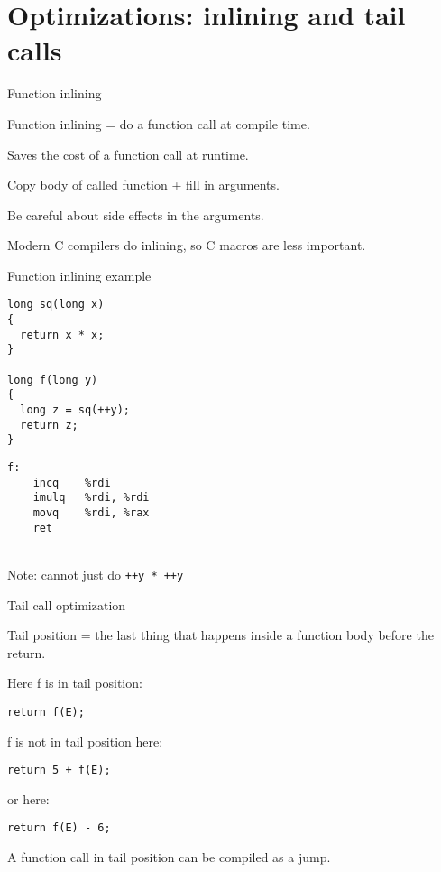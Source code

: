 \documentclass[landscape]{beamer}
\begin{document}
\section{Optimizations: inlining and tail calls}


\begin{frame}{Function inlining}

Function inlining = do a function call at compile time.

Saves the cost of a function call at runtime.

Copy body of called function + fill in arguments.

Be careful about side effects in the arguments.

Modern C compilers do inlining, so C macros are less important.

\end{frame}

\begin{frame}[fragile]{Function inlining example}
\begin{minipage}{.5\textwidth}
\begin{verbatim}
long sq(long x)
{
  return x * x;
}

long f(long y)
{
  long z = sq(++y);
  return z;
}
\end{verbatim}
\end{minipage}
%
\begin{minipage}{.4\textwidth}
\begin{verbatim}
f:                   
	incq	%rdi
	imulq	%rdi, %rdi
	movq	%rdi, %rax
	ret
\end{verbatim}
\end{minipage}
\\[2em]

Note: cannot just do \texttt{++y * ++y}
\end{frame}



\begin{frame}[fragile]{Tail call optimization}

Tail position = the last thing that happens inside a function body before the return.


Here f is in tail position:
\begin{verbatim}
return f(E);
\end{verbatim}
f is not in tail position here:
\begin{verbatim}
return 5 + f(E);
\end{verbatim}
or here:
\begin{verbatim}
return f(E) - 6;
\end{verbatim}
A function call in tail position can be compiled as a jump.

\end{frame}
\end{document}

